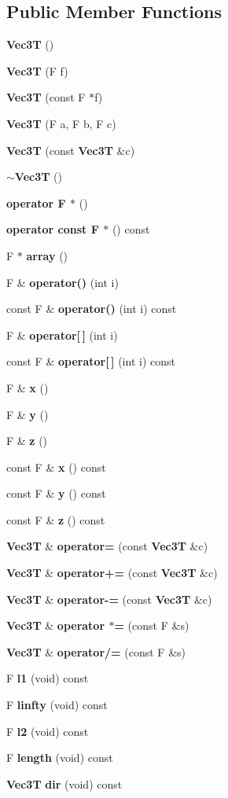 \subsection*{Public Member Functions}
\begin{CompactItemize}
\item 
{\bf Vec3T} ()
\item 
{\bf Vec3T} (F f)
\item 
{\bf Vec3T} (const F $\ast$f)
\item 
{\bf Vec3T} (F a, F b, F c)
\item 
{\bf Vec3T} (const {\bf Vec3T} \&c)
\item 
{\bf $\sim$Vec3T} ()
\item 
{\bf operator F $\ast$} ()
\item 
{\bf operator const F $\ast$} () const 
\item 
F $\ast$ {\bf array} ()
\item 
F \& {\bf operator()} (int i)
\item 
const F \& {\bf operator()} (int i) const 
\item 
F \& {\bf operator[$\,$]} (int i)
\item 
const F \& {\bf operator[$\,$]} (int i) const 
\item 
F \& {\bf x} ()
\item 
F \& {\bf y} ()
\item 
F \& {\bf z} ()
\item 
const F \& {\bf x} () const 
\item 
const F \& {\bf y} () const 
\item 
const F \& {\bf z} () const 
\item 
{\bf Vec3T} \& {\bf operator=} (const {\bf Vec3T} \&c)
\item 
{\bf Vec3T} \& {\bf operator+=} (const {\bf Vec3T} \&c)
\item 
{\bf Vec3T} \& {\bf operator-=} (const {\bf Vec3T} \&c)
\item 
{\bf Vec3T} \& {\bf operator $\ast$=} (const F \&s)
\item 
{\bf Vec3T} \& {\bf operator/=} (const F \&s)
\item 
F {\bf l1} (void) const 
\item 
F {\bf linfty} (void) const 
\item 
F {\bf l2} (void) const 
\item 
F {\bf length} (void) const 
\item 
{\bf Vec3T} {\bf dir} (void) const 
\end{CompactItemize}
